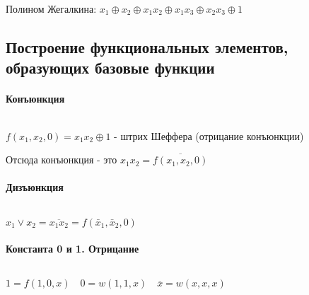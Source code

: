 Полином Жегалкина:
$
\boxed{
x_{1} \oplus x_{2} \oplus x_{1}x_{2} \oplus x_{1}x_{3} \oplus x_{2}x_{3} \oplus 1
}
$

\subsection{Построение функциональных элементов, образующих базовые функции}

\paragraph*{Конъюнкция} ${}$ \newline

$f(x_1,x_2,0) = x_1x_2 \oplus 1$ - штрих Шеффера (отрицание конъюнкции)

\medskip

Отсюда конъюнкция - это $x_1x_2 = \overline{f(x_1,x_2,0)}$ 


\paragraph*{Дизъюнкция} ${}$ \newline

$x_1 \lor x_2 = \overline{x_1x_2} = f(\bar{x}_1, \bar{x}_2, 0)$ 

\paragraph*{Константа 0 и 1. Отрицание} ${}$ \newline

$
1 = f(1,0,x) \quad
0 = w(1,1,x) \quad
\overline{x} = w(x,x,x)
$




